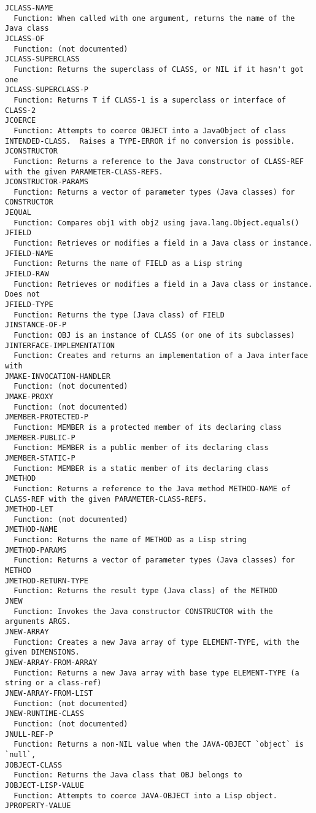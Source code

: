 \begin{verbatim}
JCLASS-NAME
  Function: When called with one argument, returns the name of the Java class
JCLASS-OF
  Function: (not documented)
JCLASS-SUPERCLASS
  Function: Returns the superclass of CLASS, or NIL if it hasn't got one
JCLASS-SUPERCLASS-P
  Function: Returns T if CLASS-1 is a superclass or interface of CLASS-2
JCOERCE
  Function: Attempts to coerce OBJECT into a JavaObject of class INTENDED-CLASS.  Raises a TYPE-ERROR if no conversion is possible.
JCONSTRUCTOR
  Function: Returns a reference to the Java constructor of CLASS-REF with the given PARAMETER-CLASS-REFS.
JCONSTRUCTOR-PARAMS
  Function: Returns a vector of parameter types (Java classes) for CONSTRUCTOR
JEQUAL
  Function: Compares obj1 with obj2 using java.lang.Object.equals()
JFIELD
  Function: Retrieves or modifies a field in a Java class or instance.
JFIELD-NAME
  Function: Returns the name of FIELD as a Lisp string
JFIELD-RAW
  Function: Retrieves or modifies a field in a Java class or instance. Does not
JFIELD-TYPE
  Function: Returns the type (Java class) of FIELD
JINSTANCE-OF-P
  Function: OBJ is an instance of CLASS (or one of its subclasses)
JINTERFACE-IMPLEMENTATION
  Function: Creates and returns an implementation of a Java interface with
JMAKE-INVOCATION-HANDLER
  Function: (not documented)
JMAKE-PROXY
  Function: (not documented)
JMEMBER-PROTECTED-P
  Function: MEMBER is a protected member of its declaring class
JMEMBER-PUBLIC-P
  Function: MEMBER is a public member of its declaring class
JMEMBER-STATIC-P
  Function: MEMBER is a static member of its declaring class
JMETHOD
  Function: Returns a reference to the Java method METHOD-NAME of CLASS-REF with the given PARAMETER-CLASS-REFS.
JMETHOD-LET
  Function: (not documented)
JMETHOD-NAME
  Function: Returns the name of METHOD as a Lisp string
JMETHOD-PARAMS
  Function: Returns a vector of parameter types (Java classes) for METHOD
JMETHOD-RETURN-TYPE
  Function: Returns the result type (Java class) of the METHOD
JNEW
  Function: Invokes the Java constructor CONSTRUCTOR with the arguments ARGS.
JNEW-ARRAY
  Function: Creates a new Java array of type ELEMENT-TYPE, with the given DIMENSIONS.
JNEW-ARRAY-FROM-ARRAY
  Function: Returns a new Java array with base type ELEMENT-TYPE (a string or a class-ref)
JNEW-ARRAY-FROM-LIST
  Function: (not documented)
JNEW-RUNTIME-CLASS
  Function: (not documented)
JNULL-REF-P
  Function: Returns a non-NIL value when the JAVA-OBJECT `object` is `null`,
JOBJECT-CLASS
  Function: Returns the Java class that OBJ belongs to
JOBJECT-LISP-VALUE
  Function: Attempts to coerce JAVA-OBJECT into a Lisp object.
JPROPERTY-VALUE

\end{verbatim}
